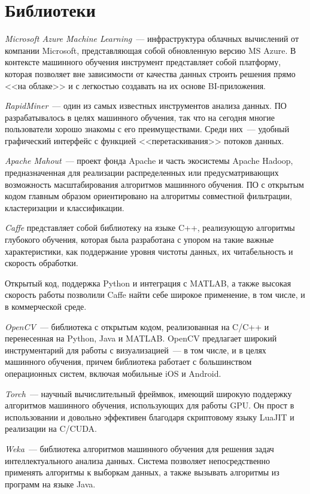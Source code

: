 \chapter{Библиотеки}
\emph{Microsoft Azure Machine Learning}~--- инфраструктура облачных вычислений от компании Microsoft,
представляющая собой обновленную версию MS Azure. В контексте машинного обучения инструмент представляет
собой платформу, которая позволяет вне зависимости от качества данных строить решения прямо <<на облаке>>
и с легкостью создавать на их основе BI-приложения.

\emph{RapidMiner}~--- один из самых известных инструментов анализа данных. ПО разрабатывалось в целях
машинного обучения, так что на сегодня многие пользователи хорошо знакомы с его преимуществами. Среди них~---
удобный графический интерфейс с функцией <<перетаскивания>> потоков данных.

\emph{Apache Mahout}~--- проект фонда Apache и часть экосистемы Apache Hadoop, предназначенная для
реализации распределенных или предусматривающих возможность масштабирования алгоритмов машинного обучения.
ПО с открытым кодом главным образом ориентировано на алгоритмы совместной фильтрации, кластеризации и
классификации.

\emph{Caffe} представляет собой библиотеку на языке C++, реализующую алгоритмы глубокого обучения, которая
была разработана с упором на такие важные характеристики, как поддержание уровня чистоты данных, их
читабельность и скорость обработки.

Открытый код, поддержка Python и интеграция с MATLAB, а также высокая скорость работы позволили Caffe найти себе широкое применение, в том числе, и в коммерческой среде.

\emph{OpenCV}~--- библиотека с открытым кодом, реализованная на C/C++ и перенесенная на Python, Java и
MATLAB. OpenCV предлагает широкий инструментарий для работы с визуализацией~--- в том числе, и в целях
машинного обучения, причем библиотека работает с большинством операционных систем, включая мобильные iOS и Android.

\emph{Torch}~--- научный вычислительный фреймвок, имеющий широкую поддержку алгоритмов машинного обучения,
использующих для работы GPU. Он прост в использовании и довольно эффективен благодаря скриптовому языку
LuaJIT и реализации на C/CUDA.

\emph{Weka}~--- библиотека алгоритмов машинного обучения для решения задач интеллектуального анализа
данных. Система позволяет непосредственно применять алгоритмы к выборкам данных, а также вызывать
алгоритмы из программ на языке Java.

